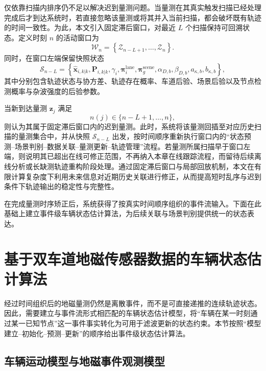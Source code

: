 \documentclass{xdupgthesis}
\begin{document}
仅依靠扫描内排序仍不足以解决迟到量测问题。当量测在其真实触发扫描已经处理完成后才到达系统时，若直接忽略该量测或将其并入当前扫描，都会破坏既有轨迹的时间一致性。为此，本文引入固定滞后窗口，对最近 $L$ 个扫描保持可回溯状态。定义时刻 $n$ 的活动窗口为
\begin{equation}
	\mathcal W_n=
	\left\{
	\mathcal Z_{n-L+1},\ldots,\mathcal Z_n
	\right\}.
	\label{eq:ch3_lag_window}
\end{equation}
同时，在窗口左端保留快照状态
\begin{equation}
	\mathcal S_{n-L}=
	\left\{
	\hat{\mathbf x}_{i,k|k},\mathbf P_{i,k|k},\gamma_i,
	\boldsymbol\pi_i^{\mathrm{lane}},
	\boldsymbol\pi_g^{\mathrm{scene}},
	\alpha_{D,b},\beta_{D,b},a_{\kappa,b},b_{\kappa,b}
	\right\},
	\label{eq:ch3_snapshot_reorg}
\end{equation}
其中分别包含轨迹状态与协方差、轨迹存在概率、车道后验、场景后验以及节点检测概率与杂波强度的后验参数。

当新到达量测 $\mathbf z_j$ 满足
\begin{equation}
	n(j)\in\{n-L+1,\ldots,n\},
	\label{eq:ch3_late_condition}
\end{equation}
则认为其属于固定滞后窗口内的迟到量测。此时，系统将该量测回插至对应历史扫描的量测集合中，并从快照 $\mathcal S_{n-L}$ 出发，按时间顺序重新执行窗口内的“状态预测--场景判别--数据关联--量测更新--轨迹管理”流程。若量测所属扫描早于窗口左端，则说明其已超出在线可修正范围，不再纳入本章在线跟踪流程，而留待后续离线分析或长缺测轨迹重构阶段处理。通过固定滞后窗口与局部回放机制，本文在有限计算复杂度下利用未来信息对近期历史关联进行修正，从而提高短时乱序与迟到条件下轨迹输出的稳定性与完整性。

在完成量测时序矫正后，系统获得了按真实时间顺序组织的事件流输入。下面在此基础上建立事件级车辆状态估计算法，为后续关联与场景判别提供统一的状态表达。

\section{基于双车道地磁传感器数据的车辆状态估计算法}
\label{sec:ch3_state_estimation}

经过时间组织后的地磁量测仍然是离散事件，而不是可直接递推的连续轨迹状态。因此，需要建立与事件流形式相匹配的车辆状态估计模型，将“车辆在某一时刻通过某一已知节点”这一事件事实转化为可用于滤波更新的状态约束。本节按照“模型建立--初始化--预测--更新”的顺序给出事件级状态估计算法。

\subsection{车辆运动模型与地磁事件观测模型}
\end{document}
